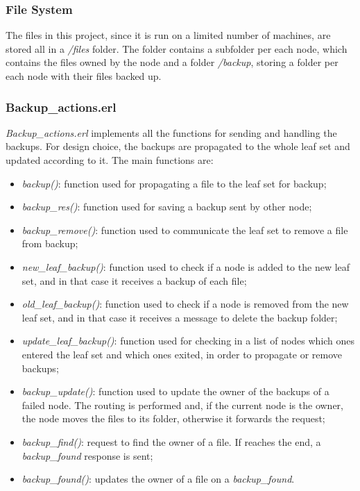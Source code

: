 \documentclass{article}
\begin{document}
\subsubsection{File System}

The files in this project, since it is run on a limited number of machines, are stored all in a \textit{/files} folder.
The folder contains a subfolder per each node, which contains the files owned by the node and a folder \textit{/backup}, storing a folder
per each node with their files backed up.

\subsubsection{Backup\_actions.erl}

\textit{Backup\_actions.erl} implements all the functions for sending and handling the backups.
For design choice, the backups are propagated to the whole leaf set and updated according to it.
The main functions are:

\begin{itemize}
    \item \textit{backup()}: function used for propagating a file to the leaf set for backup;
    \item \textit{backup\_res()}: function used for saving a backup sent by other node;
    \item \textit{backup\_remove()}: function used to communicate the leaf set to remove a file from backup;
    \item \textit{new\_leaf\_backup()}: function used to check if a node is added to the new leaf set, 
    and in that case it receives a backup of each file;
    \item \textit{old\_leaf\_backup()}: function used to check if a node is removed from the new leaf set, 
    and in that case it receives a message to delete the backup folder;
    \item \textit{update\_leaf\_backup()}: function used for checking in a list of nodes which
    ones entered the leaf set and which ones exited, in order to propagate or remove backups;
    \item \textit{backup\_update()}: function used to update the owner of the backups of a failed node.
    The routing is performed and, if the current node is the owner, the node moves the files to its folder,
    otherwise it forwards the request;
    \item \textit{backup\_find()}: request to find the owner of a file. If reaches the end, a \textit{backup\_found} 
    response is sent;
    \item \textit{backup\_found()}: updates the owner of a file on a \textit{backup\_found}.
\end{itemize}
\end{document}
